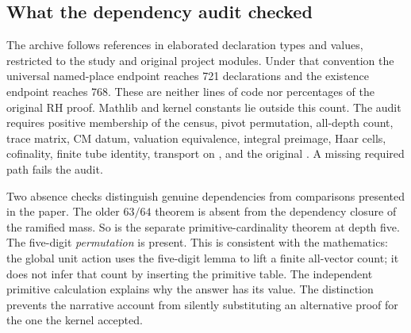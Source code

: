 \documentclass[12pt,letterpaper]{article}
\newcommand{\code}[1]{\texttt{\detokenize{#1}}}
\begin{document}
\subsection{What the dependency audit checked}
The archive follows references in elaborated declaration types and values, restricted to the study and original project modules. Under that convention the universal named-place endpoint reaches 721 declarations and the existence endpoint reaches 768. These are neither lines of code nor percentages of the original RH proof. Mathlib and kernel constants lie outside this count. The audit requires positive membership of the census, pivot permutation, all-depth count, trace matrix, CM datum, valuation equivalence, integral preimage, Haar cells, cofinality, finite tube identity, transport on \code{latV}, and the original \code{FibreRatio.ratio_field}. A missing required path fails the audit.
\par
Two absence checks distinguish genuine dependencies from comparisons presented in the paper. The older $63/64$ theorem is absent from the dependency closure of the ramified mass. So is the separate primitive-cardinality theorem at depth five. The five-digit \emph{permutation} is present. This is consistent with the mathematics: the global unit action uses the five-digit lemma to lift a finite all-vector count; it does not infer that count by inserting the primitive table. The independent primitive calculation explains why the answer has its value. The distinction prevents the narrative account from silently substituting an alternative proof for the one the kernel accepted.
\end{document}
